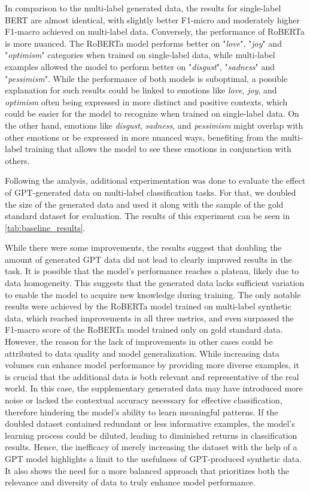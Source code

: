 \documentclass[manuscript]{clv3}
\begin{document}
In comparison to the multi-label generated data, the results for single-label BERT are almost identical, with slightly better F1-micro and moderately higher F1-macro achieved on multi-label data. Conversely, the performance of RoBERTa is more nuanced. The RoBERTa model performs better on "\textit{love}", "\textit{joy}" and "\textit{optimism}" categories when trained on single-label data, while multi-label examples allowed the model to perform better on "\textit{disgust}", "\textit{sadness}" and "\textit{pessimism}". While the performance of both models is suboptimal, a possible explanation for such results could be linked to emotions like \textit{love}, \textit{joy}, and \textit{optimism} often being expressed in more distinct and positive contexts, which could be easier for the model to recognize when trained on single-label data. On the other hand, emotions like \textit{disgust}, \textit{sadness}, and \textit{pessimism} might overlap with other emotions or be expressed in more nuanced ways, benefiting from the multi-label training that allows the model to see these emotions in conjunction with others.

Following the analysis, additional experimentation was done to evaluate the effect of GPT-generated data on multi-label classification tasks. For that, we doubled the size of the generated data and used it along with the sample of the gold standard dataset for evaluation. The results of this experiment can be seen in \autoref{tab:baseline_results}.

While there were some improvements, the results suggest that doubling the amount of generated GPT data did not lead to clearly improved results in the task. It is possible that the model's performance reaches a plateau, likely due to data homogeneity. This suggests that the generated data lacks sufficient variation to enable the model to acquire new knowledge during training. The only notable results were achieved by the RoBERTa model trained on multi-label synthetic data, which reached improvements in all three metrics, and even surpassed the F1-macro score of the RoBERTa model trained only on gold standard data. However, the reason for the lack of improvements in other cases could be attributed to data quality and model generalization. While increasing data volumes can enhance model performance by providing more diverse examples, it is crucial that the additional data is both relevant and representative of the real world. In this case, the supplementary generated data may have introduced more noise or lacked the contextual accuracy necessary for effective classification, therefore hindering the model's ability to learn meaningful patterns. If the doubled dataset contained redundant or less informative examples, the model's learning process could be diluted, leading to diminished returns in classification results. Hence, the inefficacy of merely increasing the dataset with the help of a GPT model highlights a limit to the usefulness of GPT-produced synthetic data. It also shows the need for a more balanced approach that prioritizes both the relevance and diversity of data to truly enhance model performance.
\end{document}
